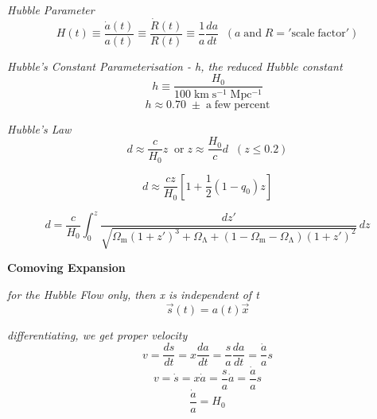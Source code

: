 \documentclass{spy}
\begin{document}
\textit {Hubble Parameter}
\begin{equation}
H(t) \equiv \frac {\dot{a}(t)}{a(t)} \equiv \frac {\dot{R}(t)}{R(t)} \equiv \frac {1}{a} \frac {da}{dt} \; \; (a \; \mathrm{and} \; R = \mathrm{'scale \; factor'})
\end{equation}

\textit {Hubble's Constant Parameterisation - h, the reduced Hubble constant}
\begin{equation}
h \equiv \frac {H_\mathrm{0}}{\mathrm{100 \; km \; s^{-1} \; Mpc^{-1}}}
\end{equation}
\begin{equation}
h \approx 0.70 \; \pm \; \mathrm{a \; few \; percent}
\end{equation}

\textit {Hubble's Law}
\begin{equation}
d \approx \frac {c}{H_\mathrm{0}}z \; \; \mathrm{or} \;z \approx \frac {H_\mathrm{0}}{c} d \; \; (z \leq {0.2})
\end{equation}

\begin{equation}
d \approx \frac {cz}{H_\mathrm{0}} \left[ 1 + \frac {1}{2} (1 - q_\mathrm{0})z \right]
\end{equation}

\begin{equation}
d = \frac{c}{H_\mathrm{0}} \int_{0}^{z} \frac{dz'}{\sqrt{\Omega_\mathrm{m} (1 + z')^3 + \Omega_\mathrm{\Lambda} + (1 - \Omega_\mathrm{m} - \Omega_\mathrm{\Lambda}) (1 + z')^2}} \,dz 
\end{equation}

\textbf {Comoving Expansion}


\textit {for the Hubble Flow only, then x is independent of t}
\begin{equation}
\vec{s}(t) = a(t) \vec{x}
\end{equation}

\textit{differentiating, we get proper velocity}
\begin{equation}
v = \frac{ds}{dt} = x \frac{da}{dt} = \frac{s}{a} \frac{da}{dt} = \frac{\dot{a}}{a}s
\end{equation}
\begin{equation}
v = \dot{s} = x \dot{a} = \frac{s}{a} \dot{a} = \frac{\dot{a}}{a}s
\end{equation}
\begin{equation}
\frac{\dot{a}}{a} = H_\mathrm{0}
\end{equation}
\end{document}
